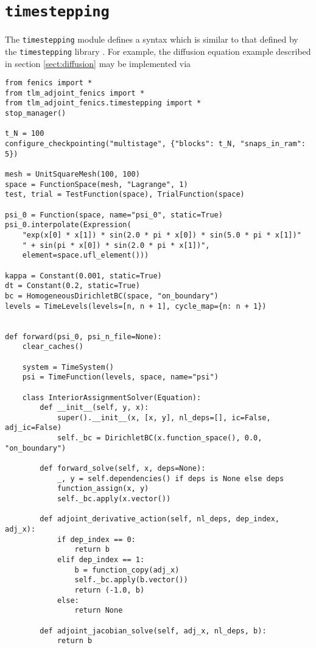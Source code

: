\documentclass[11pt]{article}
\begin{document}
\section{\texttt{timestepping}}

The \texttt{timestepping} module defines a syntax which is similar to that
defined by the \texttt{timestepping} library \citep[see][]{maddison2014}. For
example, the diffusion equation example described in section
\ref{sect:diffusion} may be implemented via
\begin{lstlisting}
from fenics import *
from tlm_adjoint_fenics import *
from tlm_adjoint_fenics.timestepping import *
stop_manager()

t_N = 100
configure_checkpointing("multistage", {"blocks": t_N, "snaps_in_ram": 5})

mesh = UnitSquareMesh(100, 100)
space = FunctionSpace(mesh, "Lagrange", 1)
test, trial = TestFunction(space), TrialFunction(space)

psi_0 = Function(space, name="psi_0", static=True)
psi_0.interpolate(Expression(
    "exp(x[0] * x[1]) * sin(2.0 * pi * x[0]) * sin(5.0 * pi * x[1])"
    " + sin(pi * x[0]) * sin(2.0 * pi * x[1])",
    element=space.ufl_element()))

kappa = Constant(0.001, static=True)
dt = Constant(0.2, static=True)
bc = HomogeneousDirichletBC(space, "on_boundary")
levels = TimeLevels(levels=[n, n + 1], cycle_map={n: n + 1})


def forward(psi_0, psi_n_file=None):
    clear_caches()

    system = TimeSystem()
    psi = TimeFunction(levels, space, name="psi")

    class InteriorAssignmentSolver(Equation):
        def __init__(self, y, x):
            super().__init__(x, [x, y], nl_deps=[], ic=False, adj_ic=False)
            self._bc = DirichletBC(x.function_space(), 0.0, "on_boundary")

        def forward_solve(self, x, deps=None):
            _, y = self.dependencies() if deps is None else deps
            function_assign(x, y)
            self._bc.apply(x.vector())

        def adjoint_derivative_action(self, nl_deps, dep_index, adj_x):
            if dep_index == 0:
                return b
            elif dep_index == 1:
                b = function_copy(adj_x)
                self._bc.apply(b.vector())
                return (-1.0, b)
            else:
                return None

        def adjoint_jacobian_solve(self, adj_x, nl_deps, b):
            return b


\end{lstlisting}
\end{document}
